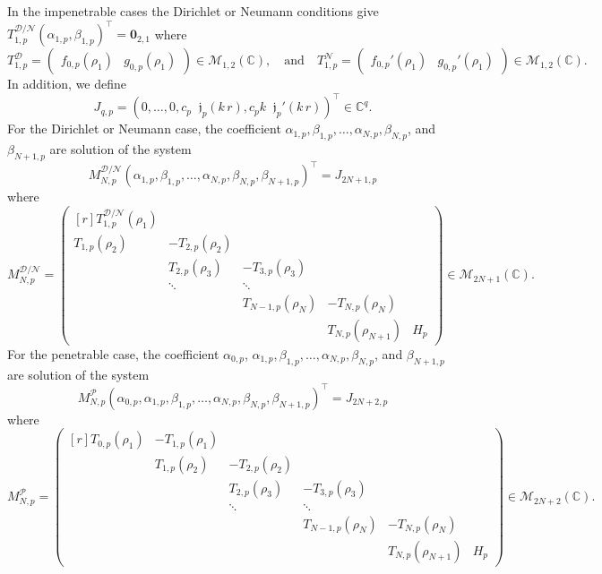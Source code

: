 \documentclass[12pt,a4paper]{article}
\theoremstyle{definition}
\theoremstyle{plain}
\theoremstyle{remark}
\newcommand{\bbC}{\mathbb{C}}
\newcommand{\calD}{\mathcal{D}}
\newcommand{\calM}{\mathcal{M}}
\newcommand{\calN}{\mathcal{N}}
\newcommand{\calP}{\mathcal{P}}
\newcommand{\frj}{\mathop{}\!\mathfrak{j}}
\newcommand{\vect}[1]{\boldsymbol{#1}}
\begin{document}
In the impenetrable cases the Dirichlet or Neumann conditions give \(T_{1, p}^{\calD/\calN} (\alpha_{1, p}, \beta_{1, p})^\intercal = \vect{0}_{2, 1}\) where
\[
    T_{1, p}^\calD = \begin{pmatrix}
        f_{0, p}(\rho_1) & g_{0, p}(\rho_1)
    \end{pmatrix} \in \calM_{1, 2}(\bbC), \quad
    \text{and} \quad
    T_{1, p}^\calN = \begin{pmatrix}
        f_{0, p}'(\rho_1) & g_{0, p}'(\rho_1)
    \end{pmatrix} \in \calM_{1, 2}(\bbC).
\]
In addition, we define
\[
    J_{q, p} = (0, \ldots, 0, c_p\frj_p(k\, r), c_p k \frj_p'(k\, r))^\intercal \in \bbC^{q}.
\]
For the Dirichlet or Neumann case, the coefficient \(\alpha_{1, p}, \beta_{1, p}, \ldots, \alpha_{N, p}, \beta_{N, p}\), and \(\beta_{N+1, p}\) are solution of the system
\[
    M_{N, p}^{\calD/\calN} (\alpha_{1, p}, \beta_{1, p}, \ldots, \alpha_{N, p}, \beta_{N, p}, \beta_{N+1, p})^\intercal = J_{2N+1, p}
\]
where
\[
    M_{N, p}^{\calD/\calN} = \begin{pmatrix*}[r]
        T_{1, p}^{\calD/\calN}(\rho_1)\\
        T_{1, p}(\rho_2) & -T_{2, p}(\rho_2)\\
        & T_{2, p}(\rho_3) & -T_{3, p}(\rho_3)\\
        & \ddots & \ddots\\
        & & T_{N-1, p}(\rho_N) & -T_{N, p}(\rho_N)\\
        & & & T_{N, p}(\rho_{N+1}) & H_p
    \end{pmatrix*} \in \calM_{2N+1}(\bbC).
\]
For the penetrable case, the coefficient \(\alpha_{0, p}\), \(\alpha_{1, p}, \beta_{1, p}, \ldots, \alpha_{N, p}, \beta_{N, p}\), and \(\beta_{N+1, p}\) are solution of the system
\[
    M_{N, p}^\calP (\alpha_{0, p}, \alpha_{1, p}, \beta_{1, p}, \ldots, \alpha_{N, p}, \beta_{N, p}, \beta_{N+1, p})^\intercal = J_{2N+2, p}
\]
where
\[
    M_{N, p}^\calP = \begin{pmatrix*}[r]
        T_{0, p}(\rho_1) & -T_{1, p}(\rho_1)\\
        & T_{1, p}(\rho_2) & -T_{2, p}(\rho_2)\\
        & & T_{2, p}(\rho_3) & -T_{3, p}(\rho_3)\\
        & & \ddots & \ddots\\
        & & & T_{N-1, p}(\rho_N) & -T_{N, p}(\rho_N)\\
        & & & & T_{N, p}(\rho_{N+1}) & H_p
    \end{pmatrix*} \in \calM_{2N+2}(\bbC).
\]
\end{document}
